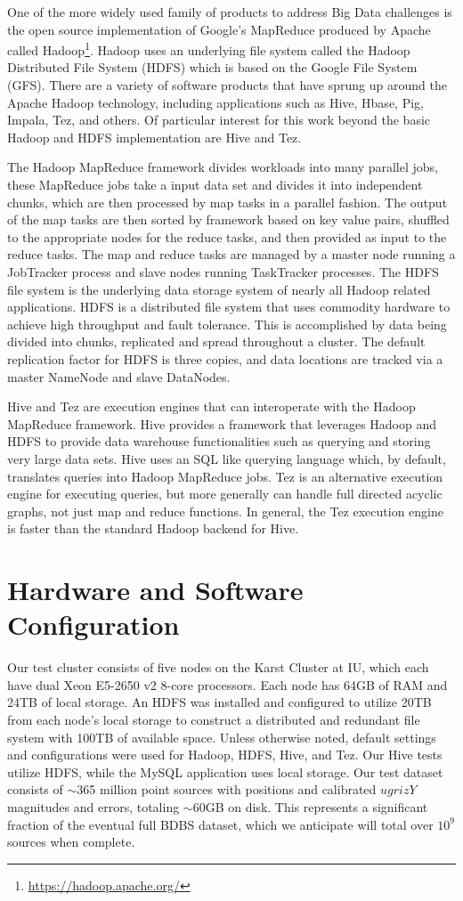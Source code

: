 \documentclass[11pt,twoside]{article}
\begin{document}
One of the more widely used family of products to address Big Data challenges is the open source
implementation of Google's MapReduce produced by Apache called
Hadoop\footnote{\url{https://hadoop.apache.org/}}. Hadoop uses an underlying file system called the Hadoop
Distributed File System (HDFS) which is based on the Google File System (GFS). There are a variety of software
products that have sprung up around the Apache Hadoop technology, including applications such as Hive, Hbase,
Pig, Impala, Tez, and others. Of particular interest for this work beyond the basic Hadoop and HDFS
implementation are Hive and Tez.

The Hadoop MapReduce framework divides workloads into many parallel jobs, these MapReduce jobs take a input
data set and divides it into independent chunks, which are then processed by map tasks in a parallel
fashion. The output of the map tasks are then sorted by framework based on key value pairs, shuffled to the
appropriate nodes for the reduce tasks, and then provided as input to the reduce tasks. The map and reduce
tasks are managed by a master node running a JobTracker process and slave nodes running TaskTracker processes.
The HDFS file system is the underlying data storage system of nearly all Hadoop related applications. HDFS is
a distributed file system that uses commodity hardware to achieve high throughput and fault tolerance. This is
accomplished by data being divided into chunks, replicated and spread throughout a cluster. The
default replication factor for HDFS is three copies, and data locations are tracked via a master NameNode
and slave DataNodes.

Hive and Tez are execution engines that can interoperate with the Hadoop MapReduce framework. Hive provides a
framework that leverages Hadoop and HDFS to provide data warehouse functionalities such as querying and
storing very large data sets. Hive uses an SQL like querying language which, by default, translates queries
into Hadoop MapReduce jobs. Tez is an alternative execution engine for executing queries, but more generally
can handle full directed acyclic graphs, not just map and reduce functions. In general, the Tez execution
engine is faster than the standard Hadoop backend for Hive.

\section{Hardware and Software Configuration}
Our test cluster consists of five nodes on the Karst Cluster at IU, which each have dual Xeon E5-2650 v2
8-core processors. Each node has 64GB of RAM and 24TB of local storage. An HDFS was installed and configured
to utilize 20TB from each node's local storage to construct a distributed and redundant file system with 100TB
of available space. Unless otherwise noted, default settings and configurations were used for Hadoop, HDFS,
Hive, and Tez. Our Hive tests utilize HDFS, while the MySQL application uses local storage.  Our test dataset
consists of $\sim$365 million point sources with positions and calibrated $ugrizY$ magnitudes and errors,
totaling $\sim$60GB on disk.  This represents a significant fraction of the eventual full BDBS dataset, which
we anticipate will total over $10^9$ sources when complete.
\end{document}

